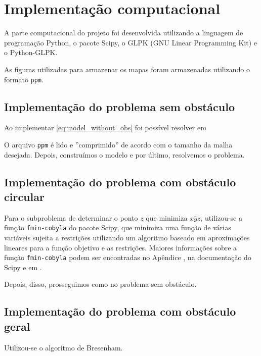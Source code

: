 %
%
%

\section{Implementa\c{c}\~{a}o computacional}
A parte computacional do projeto foi desenvolvida utilizando a linguagem de
programação Python\nocite{Python}, o pacote Scipy, o GLPK (GNU Linear
Programming Kit)\nocite{GLPK} e o Python-GLPK.

As figuras utilizadas para armazenar os mapas foram armazenadas
utilizando o formato \texttt{ppm}.

\subsection{Implementação do problema sem obstáculo}
Ao implementar \eqref{eq:model_without_obs} foi possível resolver em

O arquivo \texttt{ppm} é lido e ''comprimido'' de acordo com o tamanho da malha
desejada. Depois, construímos o modelo e por último, resolvemos o problema.

\subsection{Implementação do problema com obstáculo circular}
Para o subproblema de determinar o ponto $z$ que minimiza $\overline{xyz}$,
utilizou-se a função \texttt{fmin-cobyla} do pacote Scipy, que minimiza uma
função de várias variáveis sujeita a restrições utilizando um algoritmo baseado
em aproximações lineares para a função objetivo e as restrições. Maiores
informações sobre a função \texttt{fmin-cobyla} podem ser encontradas no
Apêndice , na documentação do Scipy e em \cite{Powell:2007}.

Depois, disso, prosseguimos como no problema sem obstáculo.

\subsection{Implementação do problema com obstáculo geral}
Utilizou-se o algoritmo de Bresenham.

